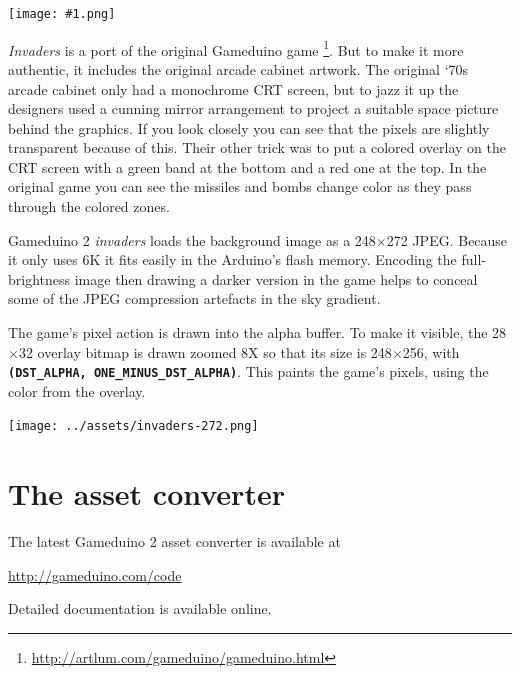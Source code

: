 \documentclass[10pt]{book}
\makeatletter
\newcommand{\gdtwo}{Gameduino 2 }
\newcommand{\png}[1]{
\begin{center}
\texttt{[image: \#1.png]}
\end{center}
}
\newcommand{\mach}[1]{\texttt{\textbf{#1}}}
\newcommand{\cmdidx}[1]{
\index{#1@\mach{#1()}}
}
\newcommand{\dcmd}[1]{\cmdidx{#1}\nameref{#1}}
\newcommand{\term}[1]{\emph{#1}\index{#1}}
\makeatother
\begin{document}
\png{invaders}

\textit{Invaders} is a port of the original Gameduino game \footnote{
\url{http://artlum.com/gameduino/gameduino.html}}.
But to make it more authentic, it includes the original arcade cabinet artwork.
The original `70s arcade cabinet only had a monochrome CRT screen,
but to jazz it up the designers used a cunning mirror arrangement to project a suitable
space picture behind the graphics.
If you look closely you can see that the pixels are slightly transparent because of this.
Their other trick was to put a colored overlay on the CRT screen with a green band at the bottom and a red one at the top.
In the original game you can see the missiles and bombs change color as they pass through the colored zones.

\gdtwo \textit{invaders} loads the background image as a 248$\times$272 JPEG.
Because it only uses 6K it fits easily in the Arduino's flash memory.
Encoding the full-brightness image then drawing a darker version in the game helps to
conceal some of the JPEG compression artefacts in the sky gradient.

The game's pixel action is drawn into the alpha buffer.
To make it visible, the 28$\times$32 overlay bitmap
is drawn zoomed 8X so that its size is 248$\times$256,
with \dcmd{BlendFunc} \mach{(DST\_ALPHA, ONE\_MINUS\_DST\_ALPHA)}.
This paints the game's pixels, using the color from the overlay.

\newpage
\begin{center}
\texttt{[image: ../assets/invaders-272.png]}
\end{center}

\begin{center}
\end{center}


\appendix
\chapter{The asset converter}

The latest \gdtwo asset converter is available at

\url{http://gameduino.com/code}

\noindent
Detailed documentation is available online.

\clearpage
{}
\printindex
\end{document}
